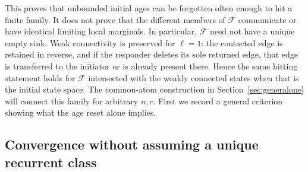 \documentclass[11pt]{article}
\begin{document}
This proves that unbounded initial ages can be forgotten often
enough to hit a finite family. It does not prove that the different
members of $\mathcal F$ communicate or have identical limiting
local marginals. In particular, $\mathcal F$ need not have a unique
empty sink. Weak connectivity is preserved for $\ell=1$: the
contacted edge is retained in reverse, and if the responder deletes
its sole returned edge, that edge is transferred to the initiator
or is already present there. Hence the same hitting statement
holds for $\mathcal F$ intersected with the weakly connected states
when that is the initial state space.
The common-atom construction in Section~\ref{sec:generalone}
will connect this family for arbitrary $n,c$. First we record a
general criterion showing what the age reset alone implies.

\subsection{Convergence without assuming a unique recurrent class}
\end{document}
